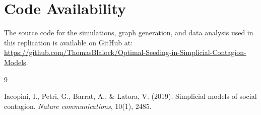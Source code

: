 \documentclass[12pt]{article}
\begin{document}
\section*{Code Availability}
The source code for the simulations, graph generation, and data analysis used in this replication is available on GitHub at: \url{https://github.com/ThomasBlalock/Optimal-Seeding-in-Simplicial-Contagion-Models}.

\begin{thebibliography}{9}

Iacopini, I., Petri, G., Barrat, A., \& Latora, V. (2019). 
Simplicial models of social contagion. 
\textit{Nature communications}, 10(1), 2485.

\end{thebibliography}
\end{document}
